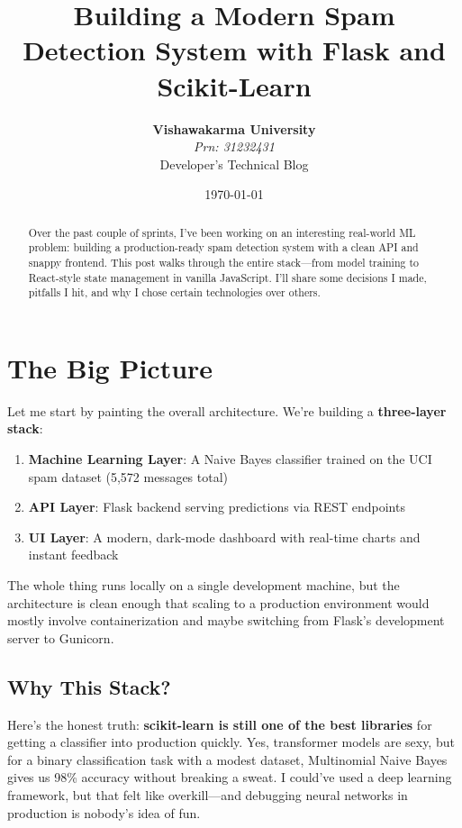 \documentclass[12pt, a4paper]{article}
\title{\textbf{Building a Modern Spam Detection System with Flask and Scikit-Learn}}
\author{\textbf{Vishawakarma University} \\[0.5em] {\large \textit{Prn: 31232431}} \\[0.3em] Developer's Technical Blog}
\date{\today}
\begin{document}
\maketitle

\begin{abstract}
Over the past couple of sprints, I've been working on an interesting real-world ML problem: building a production-ready spam detection system with a clean API and snappy frontend. This post walks through the entire stack—from model training to React-style state management in vanilla JavaScript. I'll share some decisions I made, pitfalls I hit, and why I chose certain technologies over others.
\end{abstract}

\tableofcontents
\newpage

\section{The Big Picture}

Let me start by painting the overall architecture. We're building a \textbf{three-layer stack}:

\begin{enumerate}
    \item \textbf{Machine Learning Layer}: A Naive Bayes classifier trained on the UCI spam dataset (5,572 messages total)
    \item \textbf{API Layer}: Flask backend serving predictions via REST endpoints
    \item \textbf{UI Layer}: A modern, dark-mode dashboard with real-time charts and instant feedback
\end{enumerate}

The whole thing runs locally on a single development machine, but the architecture is clean enough that scaling to a production environment would mostly involve containerization and maybe switching from Flask's development server to Gunicorn.

\subsection{Why This Stack?}

Here's the honest truth: \textbf{scikit-learn is still one of the best libraries} for getting a classifier into production quickly. Yes, transformer models are sexy, but for a binary classification task with a modest dataset, Multinomial Naive Bayes gives us 98\% accuracy without breaking a sweat. I could've used a deep learning framework, but that felt like overkill—and debugging neural networks in production is nobody's idea of fun.
\end{document}
